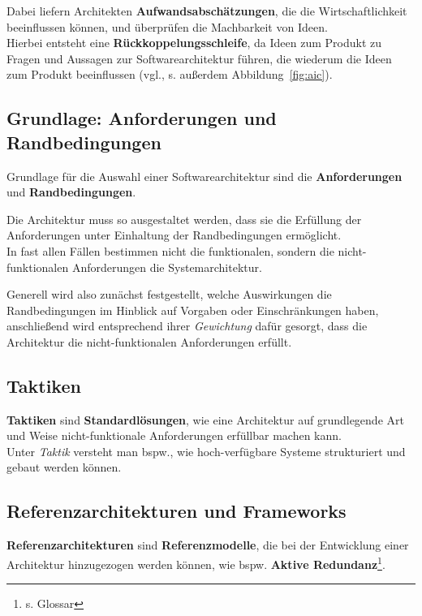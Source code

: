 \noindent
Dabei liefern Architekten \textbf{Aufwandsabschätzungen}, die die Wirtschaftlichkeit beeinflussen können, und überprüfen die Machbarkeit von Ideen.\\
Hierbei entsteht eine \textbf{Rückkoppelungsschleife}, da Ideen zum Produkt zu Fragen und Aussagen zur Softwarearchitektur führen, die wiederum die Ideen zum Produkt beeinflussen (vgl.\cite[37]{Wed09b}, s. außerdem Abbildung~\ref{fig:aic}).

\subsection*{Grundlage: Anforderungen und Randbedingungen}
Grundlage für die Auswahl einer Softwarearchitektur sind die \textbf{Anforderungen} und \textbf{Randbedingungen}.

\vspace{2mm}
\begin{tcolorbox}
    Die Architektur muss so ausgestaltet werden, dass sie die Erfüllung der Anforderungen unter Einhaltung der Randbedingungen ermöglicht.\\
    In fast allen Fällen bestimmen nicht die funktionalen, sondern die nicht-funktionalen Anforderungen die Systemarchitektur.
\end{tcolorbox}
\vspace{2mm}

\noindent
Generell wird also zunächst festgestellt, welche Auswirkungen die Randbedingungen im Hinblick auf Vorgaben oder Einschränkungen haben, anschließend wird entsprechend ihrer \textit{Gewichtung} dafür gesorgt, dass die Architektur die nicht-funktionalen Anforderungen erfüllt.

\subsection*{Taktiken}
\textbf{Taktiken} sind \textbf{Standardlösungen}, wie eine Architektur auf grundlegende Art und Weise nicht-funktionale Anforderungen erfüllbar machen kann.\\
Unter \textit{Taktik} versteht man bspw., wie hoch-verfügbare Systeme strukturiert und gebaut werden können.

\subsection*{Referenzarchitekturen und Frameworks}
\textbf{Referenzarchitekturen} sind \textbf{Referenzmodelle}, die bei der Entwicklung einer Architektur hinzugezogen werden können, wie bspw. \textbf{Aktive Redundanz}\footnote{s. Glossar}.\\

